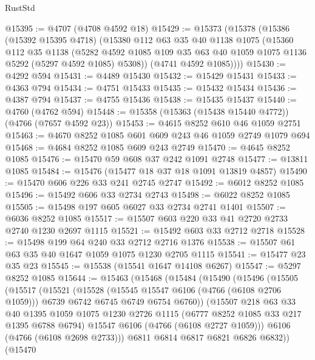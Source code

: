 \begin{lexlean}{RustStd}
\begin{coremodule}
@15395 := @4707 (@4708 @4592 @18)
@15429 := @15373
    (@15378
      (@15386
        (@15392 @15395 @4718)
        (@15380
          @112
          @63
          @35
          @40
          @1138
          @1075
          (@15360
            @112
            @35
            @1138
            (@5282 @4592 @1085 @109 @35 @63 @40 @1059 @1075 @1136 @5292 (@5297 @4592 @1085) @5308))
          (@4741 @4592 @1085))))
@15430 := @4292 @594
@15431 := @4489 @15430
@15432 := @15429 @15431
@15433 := @4363 @794
@15434 := @4751 @15433
@15435 := @15432 @15434
@15436 := @4387 @794
@15437 := @4755 @15436
@15438 := @15435 @15437
@15440 := @4760 (@4762 @594)
@15448 := @15358 (@15363 (@15438 @15440 @4772)) (@4766 (@7657 @4592 @23))
@15453 := @4615 @8252 @610 @46 @1059 @2751
@15463 := @4670 @8252 @1085 @601 @609 @243 @46 @1059 @2749 @1079 @694
@15468 := @4684 @8252 @1085 @609 @243 @2749
@15470 := @4645 @8252 @1085
@15476 := @15470 @59 @608 @37 @242 @1091 @2748
@15477 := @13811 @1085
@15484 := @15476 (@15477 @18 @37 @18 @1091 @13819 @4857)
@15490 := @15470 @606 @226 @33 @241 @2745 @2747
@15492 := @6012 @8252 @1085
@15496 := @15492 @606 @33 @2734 @2743
@15498 := @6022 @8252 @1085
@15505 := @15498 @197 @605 @6027 @33 @2734 @2741 @1401
@15507 := @6036 @8252 @1085
@15517 := @15507 @603 @220 @33 @41 @2720 @2733 @2740 @1230 @2697 @1115
@15521 := @15492 @603 @33 @2712 @2718
@15528 := @15498 @199 @64 @240 @33 @2712 @2716 @1376
@15538 := @15507 @61 @63 @35 @40 @1647 @1059 @1075 @1230 @2705 @1115
@15541 := @15477 @23 @35 @23
@15545 := @15538 (@15541 @1647 @14108 @6267)
@15547 := @5297 @8252 @1085
@15644 := @15463
    (@15468
      (@15484
        (@15490
          (@15496
            (@15505
              (@15517
                (@15521
                  (@15528
                    (@15545 @15547 @6106 (@4766 (@6108 @2706 @1059)))
                    @6739
                    @6742
                    @6745
                    @6749
                    @6754
                    @6760))
                (@15507
                  @218
                  @63
                  @33
                  @40
                  @1395
                  @1059
                  @1075
                  @1230
                  @2726
                  @1115
                  (@6777 @8252 @1085 @33 @217 @1395 @6788 @6794)
                  @15547
                  @6106
                  (@4766 (@6108 @2727 @1059)))
                @6106
                (@4766 (@6108 @2698 @2733)))
              @6811
              @6814
              @6817
              @6821
              @6826
              @6832))
          (@15470

\end{coremodule}
\end{lexlean}
